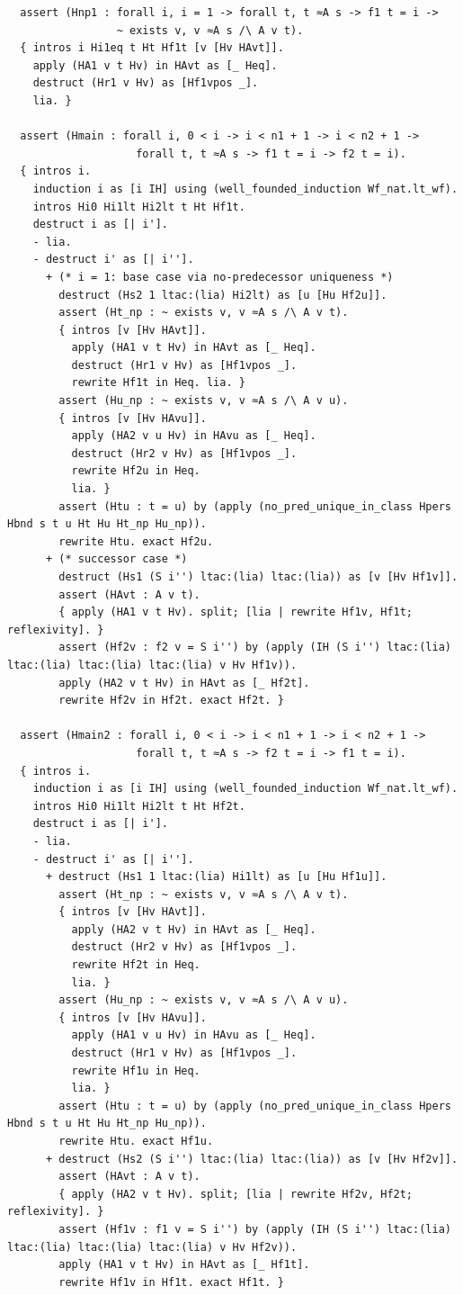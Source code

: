 \begin{latin}
\begin{verbatim}
  assert (Hnp1 : forall i, i = 1 -> forall t, t ≈A s -> f1 t = i ->
                 ~ exists v, v ≈A s /\ A v t).
  { intros i Hi1eq t Ht Hf1t [v [Hv HAvt]].
    apply (HA1 v t Hv) in HAvt as [_ Heq].
    destruct (Hr1 v Hv) as [Hf1vpos _].
    lia. }

  assert (Hmain : forall i, 0 < i -> i < n1 + 1 -> i < n2 + 1 ->
                    forall t, t ≈A s -> f1 t = i -> f2 t = i).
  { intros i.
    induction i as [i IH] using (well_founded_induction Wf_nat.lt_wf).
    intros Hi0 Hi1lt Hi2lt t Ht Hf1t.
    destruct i as [| i'].
    - lia.
    - destruct i' as [| i''].
      + (* i = 1: base case via no-predecessor uniqueness *)
        destruct (Hs2 1 ltac:(lia) Hi2lt) as [u [Hu Hf2u]].
        assert (Ht_np : ~ exists v, v ≈A s /\ A v t).
        { intros [v [Hv HAvt]].
          apply (HA1 v t Hv) in HAvt as [_ Heq].
          destruct (Hr1 v Hv) as [Hf1vpos _].
          rewrite Hf1t in Heq. lia. }
        assert (Hu_np : ~ exists v, v ≈A s /\ A v u).
        { intros [v [Hv HAvu]]. 
          apply (HA2 v u Hv) in HAvu as [_ Heq].
          destruct (Hr2 v Hv) as [Hf1vpos _].
          rewrite Hf2u in Heq.
          lia. }
        assert (Htu : t = u) by (apply (no_pred_unique_in_class Hpers Hbnd s t u Ht Hu Ht_np Hu_np)).
        rewrite Htu. exact Hf2u.
      + (* successor case *)
        destruct (Hs1 (S i'') ltac:(lia) ltac:(lia)) as [v [Hv Hf1v]].
        assert (HAvt : A v t).
        { apply (HA1 v t Hv). split; [lia | rewrite Hf1v, Hf1t; reflexivity]. }
        assert (Hf2v : f2 v = S i'') by (apply (IH (S i'') ltac:(lia) ltac:(lia) ltac:(lia) ltac:(lia) v Hv Hf1v)).
        apply (HA2 v t Hv) in HAvt as [_ Hf2t].
        rewrite Hf2v in Hf2t. exact Hf2t. }

  assert (Hmain2 : forall i, 0 < i -> i < n1 + 1 -> i < n2 + 1 ->
                    forall t, t ≈A s -> f2 t = i -> f1 t = i).
  { intros i.
    induction i as [i IH] using (well_founded_induction Wf_nat.lt_wf).
    intros Hi0 Hi1lt Hi2lt t Ht Hf2t.
    destruct i as [| i'].
    - lia.
    - destruct i' as [| i''].
      + destruct (Hs1 1 ltac:(lia) Hi1lt) as [u [Hu Hf1u]].
        assert (Ht_np : ~ exists v, v ≈A s /\ A v t).
        { intros [v [Hv HAvt]]. 
          apply (HA2 v t Hv) in HAvt as [_ Heq].
          destruct (Hr2 v Hv) as [Hf1vpos _]. 
          rewrite Hf2t in Heq. 
          lia. }
        assert (Hu_np : ~ exists v, v ≈A s /\ A v u).
        { intros [v [Hv HAvu]]. 
          apply (HA1 v u Hv) in HAvu as [_ Heq]. 
          destruct (Hr1 v Hv) as [Hf1vpos _].
          rewrite Hf1u in Heq. 
          lia. }
        assert (Htu : t = u) by (apply (no_pred_unique_in_class Hpers Hbnd s t u Ht Hu Ht_np Hu_np)).
        rewrite Htu. exact Hf1u.
      + destruct (Hs2 (S i'') ltac:(lia) ltac:(lia)) as [v [Hv Hf2v]].
        assert (HAvt : A v t).
        { apply (HA2 v t Hv). split; [lia | rewrite Hf2v, Hf2t; reflexivity]. }
        assert (Hf1v : f1 v = S i'') by (apply (IH (S i'') ltac:(lia) ltac:(lia) ltac:(lia) ltac:(lia) v Hv Hf2v)).
        apply (HA1 v t Hv) in HAvt as [_ Hf1t].
        rewrite Hf1v in Hf1t. exact Hf1t. }


\end{verbatim}
\end{latin}
